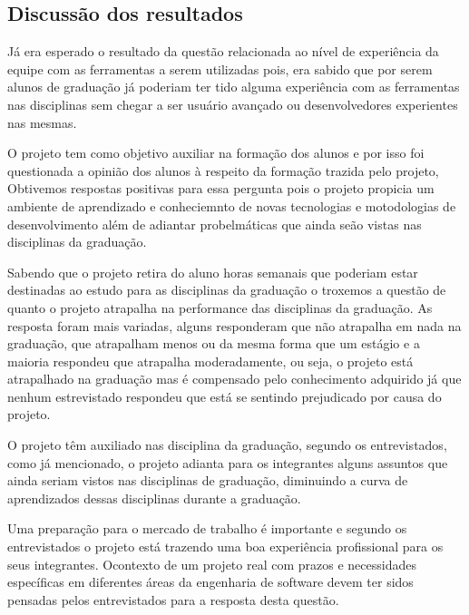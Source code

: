 \subsection{Discussão dos resultados}

Já era esperado o resultado da questão relacionada ao nível de experiência da equipe com as ferramentas a serem utilizadas pois, era sabido que por serem alunos de graduação já poderiam ter tido alguma experiência com as ferramentas nas disciplinas sem chegar a ser usuário avançado ou desenvolvedores experientes nas mesmas.

O projeto tem como objetivo auxiliar na formação dos alunos e por isso foi questionada a opinião dos alunos à respeito da formação trazida pelo projeto, Obtivemos respostas positivas para essa pergunta pois o projeto propicia um ambiente de aprendizado e conheciemnto de novas tecnologias e motodologias de desenvolvimento além de adiantar probelmáticas que ainda seão vistas nas disciplinas da graduação.

Sabendo que o projeto retira do aluno horas semanais que poderiam estar destinadas ao estudo para as disciplinas da graduação o troxemos a questão de quanto o projeto atrapalha  na performance das disciplinas da graduação. As resposta foram mais variadas, alguns responderam que não atrapalha em nada na graduação, que atrapalham menos ou da mesma forma que um estágio e a maioria respondeu que atrapalha moderadamente, ou seja, o projeto está atrapalhado na graduação mas é compensado pelo conhecimento adquirido já que nenhum estrevistado respondeu que está se sentindo prejudicado por causa do projeto.

O projeto têm auxiliado nas disciplina da graduação, segundo os entrevistados, como já mencionado, o projeto adianta para os integrantes alguns assuntos que ainda seriam vistos nas disciplinas de graduação, diminuindo a curva de aprendizados dessas disciplinas durante a graduação.

Uma preparação para o mercado de trabalho é importante e segundo os entrevistados o projeto está trazendo uma boa experiência profissional para os seus integrantes. Ocontexto de um projeto real com prazos e necessidades específicas em diferentes áreas da engenharia de software devem ter sidos pensadas pelos entrevistados para a resposta desta questão. 